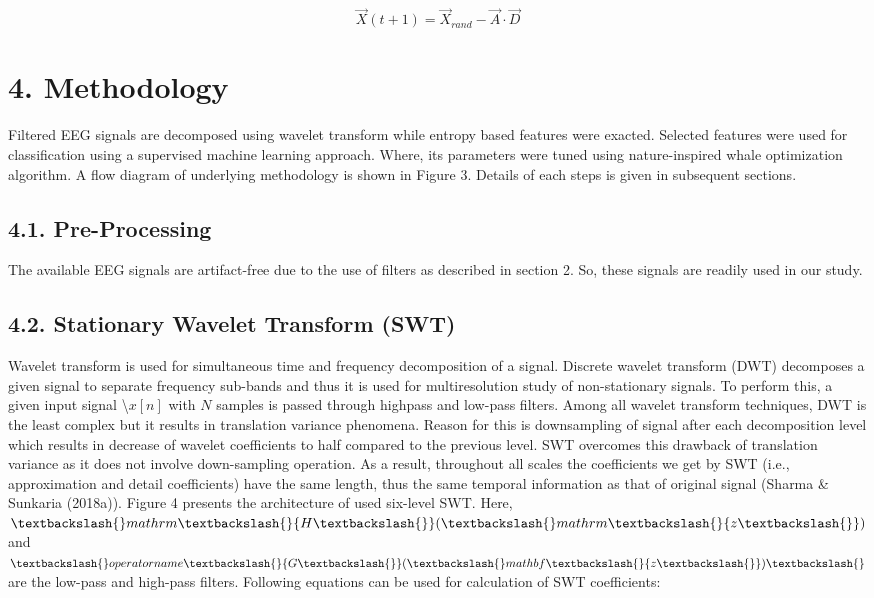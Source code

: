 \documentclass{article}
\begin{document}
\begin{equation}
\vec{X}(t+1)=\vec{X}_{r a n d}-\vec{A}\cdot\vec{D}
\end{equation}



\section{4. Methodology}

Filtered EEG signals are decomposed using wavelet transform while entropy based features were exacted. Selected features were used for classification using a supervised machine learning approach. Where, its parameters were tuned using nature-inspired whale optimization algorithm. A flow diagram of underlying methodology is shown in Figure 3. Details of each steps is given in subsequent sections.

\subsection{4.1. Pre-Processing}

The available EEG signals are artifact-free due to the use of filters as described in section 2. So, these signals are readily used in our study.

\subsection{4.2. Stationary Wavelet Transform (SWT)}

Wavelet transform is used for simultaneous time and frequency decomposition of a signal. Discrete wavelet transform (DWT) decomposes a given signal to separate frequency sub-bands and thus it is used for multiresolution study of non-stationary signals. To perform this, a given input signal \textbackslash{}$x[n]$ with $N$ samples is passed through highpass and low-pass filters. Among all wavelet transform techniques, DWT is the least complex but it results in translation variance phenomena. Reason for this is downsampling of signal after each decomposition level which results in decrease of wavelet coefficients to half compared to the previous level. SWT overcomes this drawback of translation variance as it does not involve down-sampling operation. As a result, throughout all scales the coefficients we get by SWT (i.e., approximation and detail coefficients) have the same length, thus the same temporal information as that of original signal (Sharma & Sunkaria (2018a)). Figure 4 presents the architecture of used six-level SWT. Here, $\textbackslash{}mathrm\textbackslash{}{H\textbackslash{}}(\textbackslash{}mathrm\textbackslash{}{z\textbackslash{}})$ and $\textbackslash{}operatorname\textbackslash{}{G\textbackslash{}}(\textbackslash{}mathbf\textbackslash{}{z\textbackslash{}})\textbackslash{}$ are the low-pass and high-pass filters. Following equations can be used for calculation of SWT coefficients:
\end{document}
